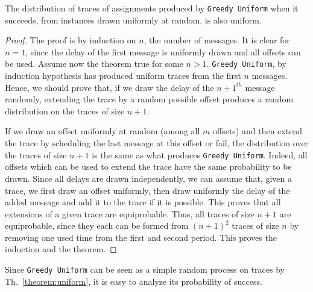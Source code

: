 \documentclass[a4paper,cleveref, autoref, thm-restate,UKenglish]{lipics-v2019}
\newcommand\greedyuniform{\texttt{Greedy Uniform}\xspace}
\begin{document}
\begin{theorem}
The distribution of traces of assignments produced by \greedyuniform when it succeeds, from instances drawn uniformly at random, is also uniform.
\end{theorem}
\begin{proof}
The proof is by induction on $n$, the number of messages. It is clear for $n=1$,
since the delay of the first message is uniformly drawn and all offsets can be used.
Assume now the theorem true for some $n>1$. \greedyuniform, by induction hypothesis has produced
uniform traces from the first $n$ messages.  Hence, we should prove that, if we draw the delay
of the $n+1^{th}$ message randomly, extending the trace by a random possible offset produces a random distribution on the traces of size $n+1$. 

 If we draw an offset uniformly at random (among all $m$ offsets) and then extend the trace by scheduling the last message at this offset or fail, the distribution over the traces of size $n+1$ is the same as what produces \greedyuniform. Indeed, all offsets which can be used to extend the trace have the same probability to be drawn. Since all delays are drawn independently, we can assume that, given a trace, we first draw an offset uniformly, then draw uniformly the delay of the added message and add it to the trace if it is possible. This proves that all extensions of a given trace are equiprobable. Thus, all traces of size $n+1$ are equiprobable, since they each can be formed from $(n+1)^2$ traces of size $n$ by removing one used time from the first and second period. This proves the induction and the theorem.
\end{proof}

Since \greedyuniform can be seen as a simple random process on traces by Th.~\ref{theorem:uniform}, it is easy to analyze its probability of success.
\end{document}
